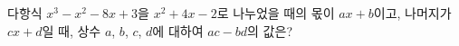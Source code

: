 다항식 $x^3-x^2-8x+3$을 $x^2+4x-2$로 나누었을 때의 몫이 $ax+b$이고, 나머지가 $cx+d$일 때, 상수 $a$, $b$, $c$, $d$에 대하여 $ac-bd$의 값은?
